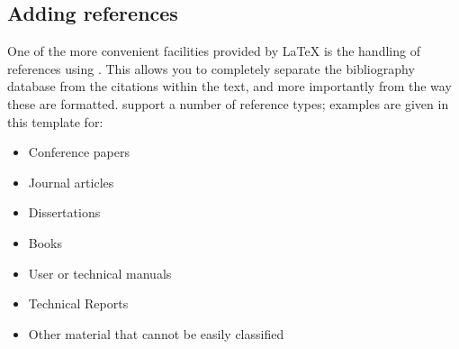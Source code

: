 \subsection{Adding references}
One of the more convenient facilities provided by \LaTeX{} is the handling of
references using \BibTeX.
This allows you to completely separate the bibliography database from the
citations within the text, and more importantly from the way these are
formatted.
\BibTeX support a number of reference types; examples are given in this
template for:
\begin{itemize}
   \item Conference papers \cite{bsw10icc}
   \item Journal articles \cite{gamal}
   \item Dissertations \cite{tunstall}
   \item Books \cite{press}
   \item User or technical manuals \cite{cuda-pg,netpbm}
   \item Technical Reports \cite{bw1994}
   \item Other material that cannot be easily classified \cite{farrell}
\end{itemize}
